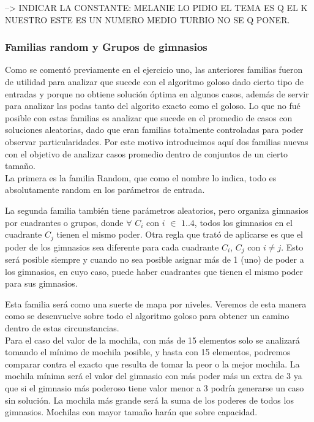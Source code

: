 --> INDICAR LA CONSTANTE: MELANIE LO PIDIO EL TEMA ES Q EL K NUESTRO ESTE ES UN NUMERO MEDIO TURBIO NO SE Q PONER.

\subsubsection{Familias random y Grupos de gimnasios}

Como se comentó previamente en el ejercicio uno, las anteriores familias fueron de utilidad para analizar que sucede con el algoritmo goloso dado cierto tipo de entradas y porque no obtiene solución óptima en algunos casos, además de servir para analizar las podas tanto del algorito exacto como el goloso. Lo que no fué posible con estas familias es analizar que sucede en el promedio de casos con soluciones aleatorias, dado que eran familias totalmente controladas para poder observar particularidades. Por este motivo introducimos aquí dos familias nuevas con el objetivo de analizar casos promedio dentro de conjuntos de un cierto tamaño.\\

La primera es la familia Random, que como el nombre lo indica, todo es absolutamente random en los parámetros de entrada.

La segunda familia también tiene parámetros aleatorios, pero organiza gimnasios por cuadrantes o grupos, donde $\forall$ $C_i$ con $i$ $\in$ ${1..4}$, todos los gimnasios en el cuadrante $C_j$ tienen el mismo poder. Otra regla que trató de aplicarse es que el poder de los gimnasios sea diferente para cada cuadrante $C_i$, $C_j$ con $i \neq j$. Esto será posible siempre y cuando no sea posible asignar m\'as de 1 (uno) de poder a los gimnasios, en cuyo caso, puede haber cuadrantes que tienen el mismo poder para sus gimnasios.

Esta familia será como una suerte de mapa por niveles. Veremos de esta manera como se desenvuelve sobre todo el algoritmo goloso para obtener un camino dentro de estas circunstancias.\\

Para el caso del valor de la mochila, con más de 15 elementos solo se analizará tomando el mínimo de mochila posible, y hasta con 15 elementos, podremos comparar contra el exacto que resulta de tomar la peor o la mejor mochila.
La mochila mínima será el valor del gimnasio con más poder más un extra de 3 ya que si el gimnasio más poderoso tiene valor menor a 3 podría generarse un caso sin solución. La mochila más grande será la suma de los poderes de todos los gimnasios. Mochilas con mayor tamaño harán que sobre capacidad.\\

